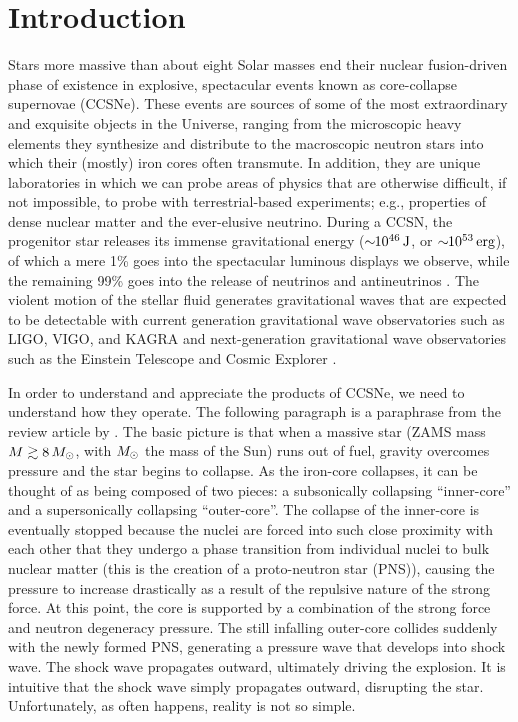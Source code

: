 \chapter{Introduction}

Stars more massive than about eight Solar masses end their nuclear
fusion-driven phase of existence in explosive, spectacular events
known as core-collapse supernovae (CCSNe).
These events are sources of some of the most extraordinary and
exquisite objects in the Universe, ranging from the microscopic heavy elements
they synthesize and distribute
to the macroscopic neutron stars into which their
(mostly) iron cores often transmute.
In addition, they are unique laboratories in which we can probe areas of
physics that are otherwise difficult, if not impossible, to probe with
terrestrial-based experiments; e.g., properties of dense nuclear matter and the
ever-elusive neutrino.
During a CCSN, the progenitor star releases its immense gravitational energy
($\sim\!\!10^{46}\,\mathrm{J}$, or $\sim\!\!10^{53}\,\mathrm{erg}$),
of which a mere 1\% goes into
the spectacular luminous displays we observe, while the remaining 99\% goes
into the release of neutrinos and antineutrinos \citep{bw2017}.
The violent motion of the stellar fluid generates gravitational waves that
are expected to be detectable with current generation gravitational wave
observatories such as LIGO, VIGO, and KAGRA \citep{aaa2020,aaa2020a}
and next-generation gravitational wave observatories such as
the Einstein Telescope \citep{mvb2020} and Cosmic Explorer \citep{eaa2021}.

In order to understand and appreciate the products of CCSNe, we need to
understand how they operate.
The following paragraph is a paraphrase from the review article by \citet{m2005}.
The basic picture is that when a massive star
(ZAMS mass $M\gtrsim8\,M_{\odot}$, with $M_{\odot}$ the mass of the Sun)
runs out of fuel, gravity overcomes pressure
and the star begins to collapse.
As the iron-core collapses, it can be thought of as being composed of
two pieces: a subsonically
collapsing ``inner-core'' and a supersonically collapsing ``outer-core''.
The collapse of the inner-core is eventually stopped because the nuclei are
forced into such close proximity with each other that they undergo a
phase transition from individual nuclei to bulk nuclear matter
(this is the creation of a proto-neutron star (PNS)),
causing the pressure to increase drastically as a result of the repulsive
nature of the strong force.
At this point, the core is supported by a combination of the strong force and
neutron degeneracy pressure.
The still infalling outer-core collides suddenly with the newly formed PNS,
generating a pressure wave that develops into shock wave.
The shock wave propagates outward, ultimately driving the explosion.
It is intuitive that the shock wave simply propagates outward, disrupting
the star.
Unfortunately, as often happens, reality is not so simple.

